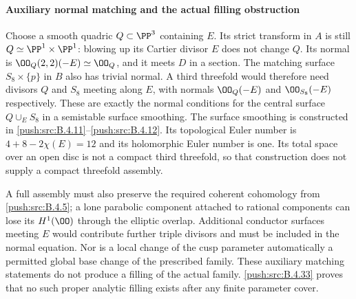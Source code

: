 \paragraph{Auxiliary normal matching and the actual filling obstruction}
Choose a smooth quadric $Q\subset\PP^3$ containing $E$.
Its strict transform in $A$ is still $Q\simeq\PP^1\times\PP^1$:
blowing up its Cartier divisor $E$ does not change $Q$.
Its normal is
$\OO_Q(2,2)(-E)\simeq\OO_Q$, and it meets $D$ in a section.
The matching surface $S_8\times\{p\}$ in $B$ also has trivial
normal. A third threefold would therefore need divisors $Q$ and
$S_8$ meeting along $E$, with normals
$\OO_Q(-E)$ and $\OO_{S_8}(-E)$ respectively.
These are exactly the normal conditions for the central surface
$Q\cup_E S_8$ in a semistable surface smoothing.
The surface smoothing is constructed in \ref{push:src:B.4.11}--\ref{push:src:B.4.12}.
Its topological Euler number is $4+8-2\chi(E)=12$ and its
holomorphic Euler number is one. Its total space over an open
disc is not a compact third threefold, so that construction
does not supply a compact threefold assembly.

A full assembly must also preserve the required coherent cohomology
from \ref{push:src:B.4.5}; a lone parabolic component attached to rational components
can lose its $H^1(\OO)$ through the elliptic overlap.
Additional conductor surfaces meeting $E$ would contribute further
triple divisors and must be included in the normal equation.
Nor is a local change of the cusp parameter automatically a permitted
global base change of the prescribed family.
These auxiliary matching statements do not produce a filling
of the actual family. \ref{push:src:B.4.33} proves that no such proper analytic
filling exists after any finite parameter cover.




